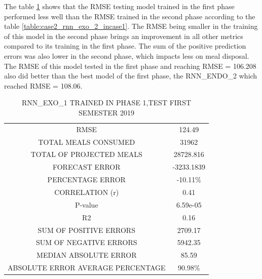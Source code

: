         The table \ref{table:case1_rnn_exo_1} shows that the RMSE testing model trained in the first phase performed less well than the RMSE trained in the second phase according to the table \ref{table:case2_rnn_exo_2_incase1}. The RMSE being smaller in the training of this model in the second phase brings an improvement in all other metrics compared to its training in the first phase.
        The sum of the positive prediction errors was also lower in the second phase, which impacts less on meal disposal.
        The RMSE of this model tested in the first phase and reaching RMSE = 106.208 also did better than the best model of the first phase, the RNN\_ENDO\_2 which reached RMSE = 108.06.
        
        
        
        
        \begin{table}[!ht]
            \centering
            \caption{RNN\_EXO\_1 TRAINED IN PHASE 1,TEST FIRST SEMESTER 2019}
            \label{table:case1_rnn_exo_1}
                \begin{tabular}{c|c}
                \rowcolor{gray!50}
                \hline
            \multicolumn{2}{c}{RNN\_EXO\_1 TRAINED IN PHASE 1,TEST FIRST SEMESTER 2019} \\
            \hline
            RMSE & 124.49\\
            TOTAL MEALS CONSUMED & 31962 \\
            TOTAL OF PROJECTED MEALS & 28728.816  \\
            FORECAST ERROR & -3233.1839 \\
            PERCENTAGE ERROR& -10.11\%  \\
            CORRELATION (r) & 0.41 \\ 
            P-value & 6.59e-05\\ 
            R2 & 0.16\\
            SUM OF POSITIVE ERRORS & 2709.17\\
            SUM OF NEGATIVE ERRORS & 5942.35\\
            MEDIAN ABSOLUTE ERROR & 85.59\\
            ABSOLUTE ERROR AVERAGE PERCENTAGE & 90.98\% \\ \hline \end{tabular} \end{table}
            
      
      
